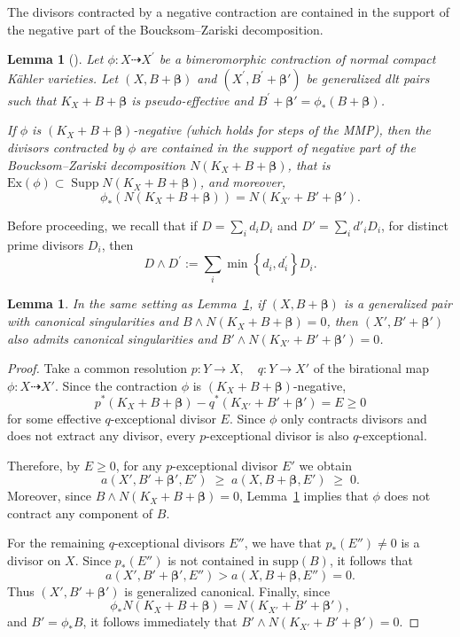\documentclass[12pt]{amsart}
\numberwithin{equation}{section}
\newtheorem{lemma}  [theorem]     {Lemma}
\theoremstyle{definition}
\theoremstyle{plain}
\newtheorem*{thm A*}{Theorem A}
\newtheorem*{thm B*}{Theorem B}
\newtheorem*{thm C*}{Theorem C}
\newtheorem*{thm D*}{Theorem D}
\theoremstyle{definition}
\renewcommand{\1}{\mathds{1}}
\newcommand{\bbeta}{\boldsymbol{\beta}}
\renewcommand{\>}{\rightarrow}
\begin{document}
The divisors contracted by a negative contraction are contained in the support of the negative part of the Boucksom--Zariski decomposition.
\begin{lemma}[{\cite[Theorem A.11]{DHY23}}]\label{ZariskiCont}
Let $\phi: X \dashrightarrow X^{\prime}$ be a bimeromorphic contraction of normal compact K\"ahler varieties. Let $\left(X, B+\boldsymbol{\beta}\right)$ and $\left(X^{\prime}, B^{\prime}+\boldsymbol{\beta}'\right)$ be generalized dlt pairs such that $K_X+B+\boldsymbol{\beta}$ is pseudo-effective and $B^{\prime}+\boldsymbol{\beta}'=\phi_*\left(B+\boldsymbol{\beta}\right)$.

If $\phi$ is $(K_X+B+\boldsymbol{\beta})$-negative (which holds for steps of the MMP), then the divisors contracted by $\phi$ are contained in the support of negative part of the Boucksom--Zariski decomposition $N\left(K_X+B+\boldsymbol{\beta}\right)$, that is $\mathrm{Ex}(\phi)\subset \operatorname{Supp} N(K_X+B+ \boldsymbol{\beta})$, and moreover, $$\phi_*(N(K_X+B+ \bbeta)) = N(K_{X'}+ B' + \bbeta ').$$
\end{lemma}
Before proceeding, we recall that if $D=\sum_i d_iD_i$ and $D'=\sum_i d'_iD_i$, for distinct prime divisors $D_i$, then 
$$D \wedge D^{\prime}:=\sum_i \min \left\{d_i, d_i^{\prime}\right\} D_i.$$
\begin{lemma}\label{singular}
In the same setting as Lemma~\ref{ZariskiCont}, if $(X,B+\bbeta)$ is a generalized pair with canonical singularities and 
$B \wedge N(K_X+B+\bbeta)=0$, then $(X',B'+\bbeta')$ also admits canonical singularities and $B' \wedge N(K_{X'}+B'+\bbeta')=0$. 
\end{lemma}

\begin{proof}
Take a common resolution $p:Y \to X, \quad q:Y \to X'$
of the birational map $\phi: X \dashrightarrow X'$. %
Since the contraction $\phi$ is $(K_X+B+\bbeta)$-negative, \[
p^*(K_X+B+\bbeta) - q^*(K_{X'}+B'+\bbeta') = E \ge 0
\]
for some effective $q$-exceptional divisor $E$. Since $\phi$ only contracts divisors and does not extract any divisor, every $p$-exceptional divisor is also $q$-exceptional. 

Therefore, by $E \ge 0$, for any  $p$-exceptional divisor $E'$ we obtain  
\[
a(X',B'+\bbeta',E') \;\ge\; a(X,B+\bbeta,E') \;\ge\; 0.
\]
Moreover, since $B \wedge N(K_X+B+\bbeta)=0$, 
Lemma~\ref{ZariskiCont} implies that $\phi$ does not contract any component of $B$. 

For the remaining $q$-exceptional divisors $E''$, we have that $p_*(E'') \neq 0$ is a divisor on $X$. Since $p_*(E'')$ is not contained in $\mathrm{supp}(B)$, it follows that  
\[
a(X',B'+\bbeta',E'') > a(X,B+\bbeta,E'') = 0.
\]
Thus $(X',B'+\bbeta')$ is generalized canonical.  Finally, since  
\[
\phi_* N(K_X+B+\bbeta) = N(K_{X'}+B'+\bbeta'),
\]
and $B' = \phi_*B$, it follows immediately that $B' \wedge N(K_{X'}+B'+\bbeta')=0$. 
\end{proof}
\end{document}
